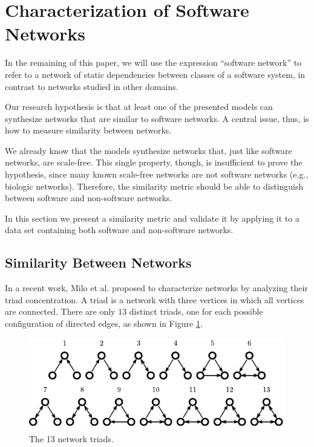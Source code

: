
\section{Characterization of Software Networks} \label{sec:characterization}

In the remaining of this paper, we will use the expression ``software network''
to refer to a network of static dependencies between classes of a software
system, in contrast to networks studied in other domains.

Our research hypothesis is that at least one of the presented models can
synthesize networks that are similar to software networks. A central issue,
thus, is how to measure similarity between networks.

We already know that the models synthesize networks that, just like software
networks, are scale-free. This single property, though, is insufficient to
prove the hypothesis, since many known scale-free networks are not software
networks (e.g., biologic networks). Therefore, the similarity metric should be
able to distinguish between software and non-software networks.

In this section we present a similarity metric and validate it by applying it
to a data set containing both software and non-software networks. 

\subsection{Similarity Between Networks}

In a recent work, Milo et al. \cite{Milo2004} proposed to characterize networks
by analyzing their triad concentration. A triad is a network with three
vertices in which all vertices are connected. There are only 13 distinct
triads, one for each possible configuration of directed edges, as shown in
Figure \ref{fig:triads}.

\begin{figure}[t]
\centering
\includegraphics{triads}
\caption{The 13 network triads.}
\label{fig:triads}
\end{figure}

